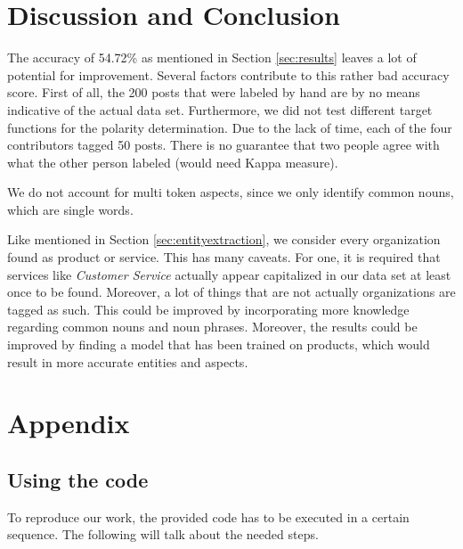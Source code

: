 \documentclass[10pt,a4paper]{article}
\begin{document}
	\section{Discussion and Conclusion}
	The accuracy of 54.72\% as mentioned in Section \ref{sec:results} leaves a lot of potential for improvement. Several factors contribute to this rather bad accuracy score. First of all, the 200 posts that were labeled by hand are by no means indicative of the actual data set. Furthermore, we did not test different target functions for the polarity determination. Due to the lack of time, each of the four contributors tagged 50 posts. There is no guarantee that two people agree with what the other person labeled (would need Kappa measure).

	We do not account for multi token aspects, since we only identify common nouns, which are single words.

	Like mentioned in Section \ref{sec:entityextraction}, we consider every organization found as product or service. This has many caveats. For one, it is required that services like \textit{Customer Service} actually appear capitalized in our data set at least once to be found. Moreover, a lot of things that are not actually organizations are tagged as such. This could be improved by incorporating more knowledge regarding common nouns and noun phrases.
	Moreover, the results could be improved by finding a model that has been trained on products, which would result in more accurate entities and aspects.
	
	\section{Appendix}
		
		\subsection{Using the code}
		To reproduce our work, the provided code has to be executed in a certain sequence. The following will talk about the needed steps.

	\newpage

	
	
\end{document}
